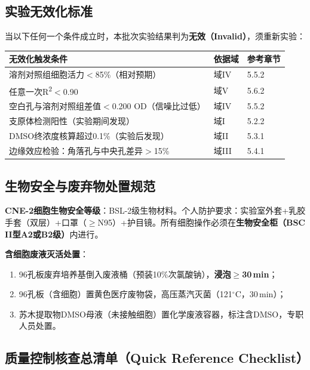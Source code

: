\documentclass[12pt,a4paper]{article}
\newcommand{\degC}{$^\circ$C}
\begin{document}
\subsection{实验无效化标准}

当以下任何一个条件成立时，本批次实验结果判为\textbf{无效（Invalid）}，须重新实验：

\begin{center}
\begin{tabular}{lll}
\toprule
\rowcolor{tabheadbg}\color{white}\textbf{无效化触发条件} & \color{white}\textbf{依据域} & \color{white}\textbf{参考章节} \\
\midrule
溶剂对照组细胞活力$<$85\%（相对预期）& 域IV & 5.5.2 \\
任意一次R\textsuperscript{2}$<$0.90 & 域V & 5.6.2 \\
空白孔与溶剂对照组差值$<$0.200 OD（信噪比过低）& 域IV & 5.5.2 \\
支原体检测阳性（实验期间发现）& 域I & 5.2.2 \\
DMSO终浓度核算超过0.1\%（实验后发现）& 域II & 5.3.1 \\
边缘效应检验：角落孔与中央孔差异$>$15\% & 域III & 5.4.1 \\
\bottomrule
\end{tabular}
\end{center}

\subsection{生物安全与废弃物处置规范}

\textbf{CNE-2细胞生物安全等级}：BSL-2级生物材料。个人防护要求：实验室外套+乳胶手套（双层）+口罩（$\geq$N95）+护目镜。所有细胞操作必须在\textbf{生物安全柜（BSC II型A2或B2级）}内进行\cite{ref32,ref33}。

\textbf{含细胞废液灭活处置}：
\begin{enumerate}
\item 96孔板废弃培养基倒入废液桶（预装10\%次氯酸钠），\textbf{浸泡$\geq$30\,min}；
\item 96孔板（含细胞）置黄色医疗废物袋，高压蒸汽灭菌（121\degC{}，30\,min）；
\item 苏木提取物DMSO母液（未接触细胞）置化学废液容器，标注含DMSO，专职人员处置。
\end{enumerate}

\subsection{质量控制核查总清单（Quick Reference Checklist）}
\end{document}
